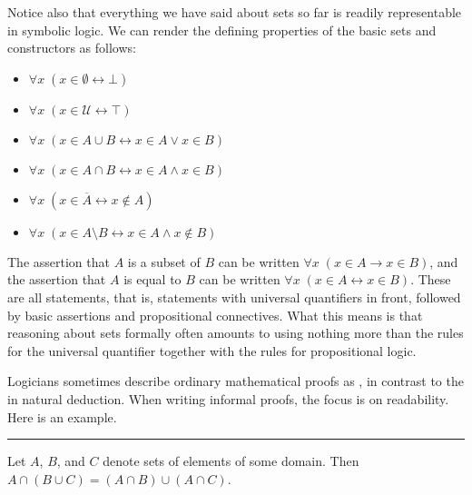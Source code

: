 \documentclass[letterpaper,10pt,english]{sphinxmanual}
\begin{document}
\sphinxAtStartPar
Notice also that everything we have said about sets so far is readily representable in symbolic logic. We can render the defining properties of the basic sets and constructors as follows:
\begin{itemize}
\item {} 
\sphinxAtStartPar
\(\forall x \; (x \in \emptyset \leftrightarrow \bot)\)

\item {} 
\sphinxAtStartPar
\(\forall x \; (x \in \mathcal U \leftrightarrow \top)\)

\item {} 
\sphinxAtStartPar
\(\forall x \; (x \in A \cup B \leftrightarrow x \in A \vee x \in B)\)

\item {} 
\sphinxAtStartPar
\(\forall x \; (x \in A \cap B \leftrightarrow x \in A \wedge x \in B)\)

\item {} 
\sphinxAtStartPar
\(\forall x \; (x \in \overline A \leftrightarrow x \notin A)\)

\item {} 
\sphinxAtStartPar
\(\forall x \; (x \in A \setminus B \leftrightarrow  x \in A \wedge x \notin B)\)

\end{itemize}

\sphinxAtStartPar
The assertion that \(A\) is a subset of \(B\) can be written \(\forall x \; (x \in A \to x \in B)\), and the assertion that \(A\) is equal to \(B\) can be written \(\forall x \; (x \in A \leftrightarrow  x \in B)\). These are all  statements, that is, statements with universal quantifiers in front, followed by basic assertions and propositional connectives. What this means is that reasoning about sets formally often amounts to using nothing more than the rules for the universal quantifier together with the rules for propositional logic.

\sphinxAtStartPar
Logicians sometimes describe ordinary mathematical proofs as , in contrast to the  in natural deduction. When writing informal proofs, the focus is on readability. Here is an example.


\bigskip\hrule\bigskip


\sphinxAtStartPar
{} Let \(A\), \(B\), and \(C\) denote sets of elements of some domain. Then \(A \cap (B \cup C) = (A \cap B) \cup (A \cap C)\).
\end{document}
